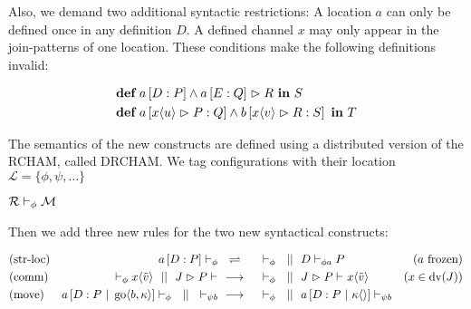 Also, we demand two additional syntactic restrictions:
A location $a$ can only be defined once in any definition $D$.
A defined channel $x$ may only appear in the join-patterns of one location.
These conditions make the following definitions invalid:

\begin{align*}
  &\jdef
    {\jloc{a}{D}{P} \jcon \jrct{\jloc{a}{E}{Q}}{R}}
    {S}
  \\
  &\jdef
    {\jloc{a}{\jrct{\jrcv{x}{u}}{P}}{Q}
     \jcon
     \jloc{b}{\jrct{\jrcv{x}{v}}{R}}{S}
     }
    {T}
\end{align*}

The semantics of the new constructs are defined using a distributed version
of the RCHAM, called DRCHAM.
We tag configurations with their location
$ \mathcal{L} = \{ \phi, \psi, \ldots \} $

$ \drchamcnf{\phi}{\mathcal{R}}{\mathcal{M}} $


Then we add three new rules for the two new syntactical constructs:

\begin{align*}
  \drchamequ{str-loc}{(a \ \text{frozen)}}{
    \drchamcnf{\phi}{\jloc{a}{D}{P}}{}
  }{
    \drchamcnf{\phi}{}{}
    \drchampar
    \drchamcnf{\phi a}{D}{P}
  }
  \\
  \drchamred{comm}{(x \in \dv{J})}{
    \drchamcnf{\phi}{}{\jsnd{x}{\tilde{v}}}
    \drchampar
    \drchamcnf{}{\jrct{J}{P}}{}
  }{
    \drchamcnf{\phi}{}{}
    \drchampar
    \drchamcnf{}{\jrct{J}{P}}{\jsnd{x}{\tilde{v}}}
  }
  \\
  \drchamred{move}{}{
    \drchamcnf{\phi}{\jloc{a}{D}{P \jpar \jgo{b}{\kappa}}}{}
    \drchampar
    \drchamcnf{\psi b}{}{}
  }{
    \drchamcnf{\phi}{}{}
    \drchampar
    \drchamcnf{\psi b}{\jloc{a}{D}{P \jpar \jsnd{\kappa}{}}}{}
  }
\end{align*}

